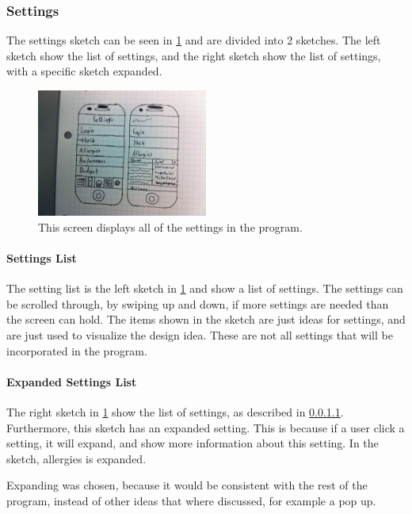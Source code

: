 \subsubsection{Settings}

The settings sketch can be seen in \cref{SettingsScreen} and are divided into 2 sketches. The left sketch show the list of settings, and the right sketch show the list of settings, with a specific sketch expanded.

\begin{figure}[H]
	\centering
    \includegraphics[width=0.5\textwidth]{Grafik/FoodPlanner/FinalSettingsSketch}
	\caption{This screen displays all of the settings in the program.}
	\label{SettingsScreen}
\end{figure}

\paragraph{Settings List} \label{SettingsList}

The setting list is the left sketch in \cref{SettingsScreen} and show a list of settings. The settings can be scrolled through, by swiping up and down, if more settings are needed than the screen can hold. The items shown in the sketch are just ideas for settings, and are just used to visualize the design idea. These are not all settings that will be incorporated in the program.

\paragraph{Expanded Settings List}

The right sketch in \cref{SettingsScreen} show the list of settings, as described in \cref{SettingsList}. Furthermore, this sketch has an expanded setting. This is because if a user click a setting,  it will expand, and show more information about this setting. In the sketch, allergies is expanded.

Expanding was chosen, because it would be consistent with the rest of the program, instead of other ideas that where discussed, for example a pop up. 